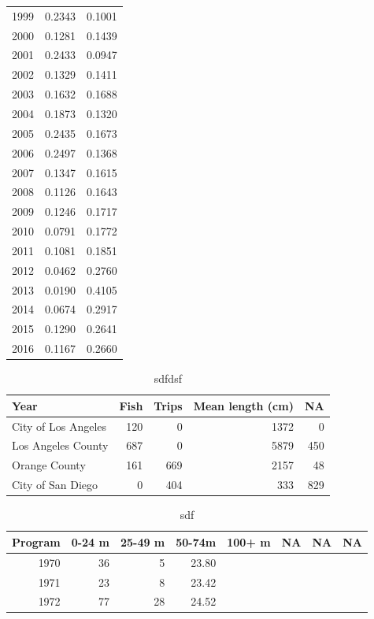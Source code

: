\documentclass[12pt,]{article}
\begin{document}
\begin{table}[ht]
{\begin{tabular}{rrr}
   1999 & 0.2343 & 0.1001 \\ 
   2000 & 0.1281 & 0.1439 \\ 
   2001 & 0.2433 & 0.0947 \\ 
   2002 & 0.1329 & 0.1411 \\ 
   2003 & 0.1632 & 0.1688 \\ 
   2004 & 0.1873 & 0.1320 \\ 
   2005 & 0.2435 & 0.1673 \\ 
   2006 & 0.2497 & 0.1368 \\ 
   2007 & 0.1347 & 0.1615 \\ 
   2008 & 0.1126 & 0.1643 \\ 
   2009 & 0.1246 & 0.1717 \\ 
   2010 & 0.0791 & 0.1772 \\ 
   2011 & 0.1081 & 0.1851 \\ 
   2012 & 0.0462 & 0.2760 \\ 
   2013 & 0.0190 & 0.4105 \\ 
   2014 & 0.0674 & 0.2917 \\ 
   2015 & 0.1290 & 0.2641 \\ 
   2016 & 0.1167 & 0.2660 \\ 
   \hline
\end{tabular}
}
\end{table}\begin{table}[ht]
\centering
\caption{sdfdsf} 
\label{tab:Fleet7_lengthdepth}
\begin{tabular}{lrrrr}
  \hline
Year & Fish & Trips & Mean length (cm) & NA \\ 
  \hline
City of Los Angeles & 120 &   0 & 1372 &   0 \\ 
  Los Angeles County & 687 &   0 & 5879 & 450 \\ 
  Orange County & 161 & 669 & 2157 &  48 \\ 
  City of San Diego &   0 & 404 & 333 & 829 \\ 
   \hline
\end{tabular}
\end{table}\begin{table}[ht]
\centering
\caption{sdf} 
\label{tab:Fleet7_lengthsample}
\begin{tabular}{rrrrllll}
  \hline
Program & 0-24 m & 25-49 m & 50-74m & 100+ m & NA & NA & NA \\ 
  \hline
1970 &  36 &   5 & 23.80 &  &  &  &  \\ 
  1971 &  23 &   8 & 23.42 &  &  &  &  \\ 
  1972 &  77 &  28 & 24.52 &  &  &  &  \\ 

\end{tabular}
\end{table}
\end{document}
